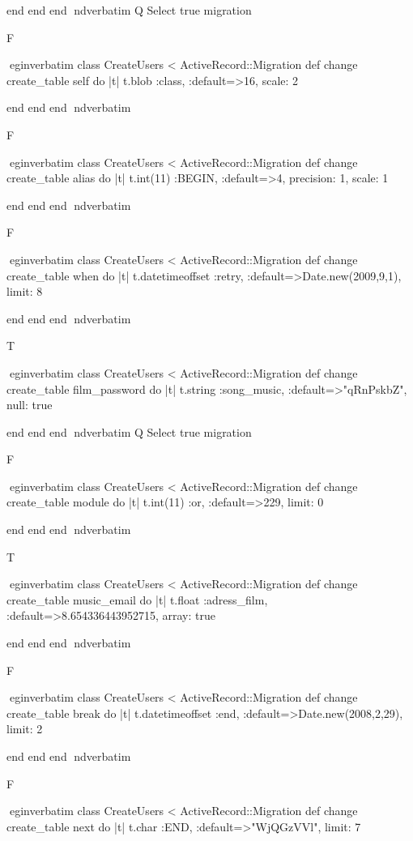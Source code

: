     end 
  end 
end
nd{verbatim}
Q
 Select true migration

F

egin{verbatim}
 class CreateUsers < ActiveRecord::Migration 
  def change 
    create_table self do |t| 
      t.blob :class, :default=>16, scale: 2
    
    end 
  end 
end
nd{verbatim}

F

egin{verbatim}
 class CreateUsers < ActiveRecord::Migration 
  def change 
    create_table alias do |t| 
      t.int(11) :BEGIN, :default=>4, precision: 1, scale: 1
    
    end 
  end 
end
nd{verbatim}

F

egin{verbatim}
 class CreateUsers < ActiveRecord::Migration 
  def change 
    create_table when do |t| 
      t.datetimeoffset :retry, :default=>Date.new(2009,9,1), limit: 8
    
    end 
  end 
end
nd{verbatim}

T

egin{verbatim}
 class CreateUsers < ActiveRecord::Migration 
  def change 
    create_table film_password do |t| 
      t.string :song_music, :default=>"qRnPskbZ", null: true
    
    end 
  end 
end
nd{verbatim}
Q
 Select true migration

F

egin{verbatim}
 class CreateUsers < ActiveRecord::Migration 
  def change 
    create_table module do |t| 
      t.int(11) :or, :default=>229, limit: 0
    
    end 
  end 
end
nd{verbatim}

T

egin{verbatim}
 class CreateUsers < ActiveRecord::Migration 
  def change 
    create_table music_email do |t| 
      t.float :adress_film, :default=>8.654336443952715, array: true
    
    end 
  end 
end
nd{verbatim}

F

egin{verbatim}
 class CreateUsers < ActiveRecord::Migration 
  def change 
    create_table break do |t| 
      t.datetimeoffset :end, :default=>Date.new(2008,2,29), limit: 2
    
    end 
  end 
end
nd{verbatim}

F

egin{verbatim}
 class CreateUsers < ActiveRecord::Migration 
  def change 
    create_table next do |t| 
      t.char :END, :default=>"WjQGzVVl", limit: 7
    
